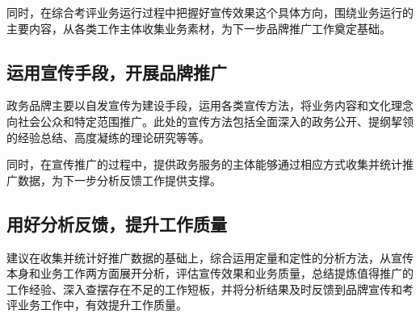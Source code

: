 \documentclass[12pt]{article} %
\begin{document}
同时，在综合考评业务运行过程中把握好宣传效果这个具体方向，围绕业务运行的主要内容，从各类工作主体收集业务素材，为下一步品牌推广工作奠定基础。

\subsection{运用宣传手段，开展品牌推广}
政务品牌主要以自发宣传为建设手段，运用各类宣传方法，将业务内容和文化理念向社会公众和特定范围推广。此处的宣传方法包括全面深入的政务公开、提纲挈领的经验总结、高度凝练的理论研究等等。

同时，在宣传推广的过程中，提供政务服务的主体能够通过相应方式收集并统计推广数据，为下一步分析反馈工作提供支撑。

\subsection{用好分析反馈，提升工作质量}
建议在收集并统计好推广数据的基础上，综合运用定量和定性的分析方法，从宣传本身和业务工作两方面展开分析，评估宣传效果和业务质量，总结提炼值得推广的工作经验、深入查摆存在不足的工作短板，并将分析结果及时反馈到品牌宣传和考评业务工作中，有效提升工作质量。
\end{document}
